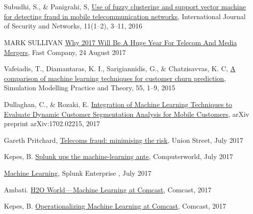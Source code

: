 \documentclass[12pt]{article}
\begin{document}
%
%

\section{}
\noindent

\begin{thebibliography}{9}
	Subudhi, S., \& Panigrahi, S, 
	\href{https://dl.acm.org/citation.cfm?id=2898531}{Use of fuzzy clustering and support vector machine for detecting fraud in mobile telecommunication networks}, 
	International Journal of Security and Networks, 
	11(1–2), 3–11,
	2016
	
	MARK SULLIVAN
	\href{https://www.fastcompany.com/3068696/why-2017-will-be-a-huge-year-for-telecom-and-media-mergers}{Why 2017 Will Be A Huge Year For Telecom And Media Mergers}, 
	Fast Company,
	24 August 2017
	
	Vafeiadis, T., Diamantaras, K. I., Sarigiannidis, G., \& Chatzisavvas, K. C, 
	\href{http://www.sciencedirect.com/science/article/pii/S1569190X15000386}{A comparison of machine learning techniques for customer churn prediction}, 
	Simulation Modelling Practice and Theory, 
	55, 1–9,
	2015
	
	Dullaghan, C., \& Rozaki, E. 
	\href{https://arxiv.org/abs/1702.02215}{Integration of Machine Learning Techniques to Evaluate Dynamic Customer Segmentation Analysis for Mobile Customers}, 
	arXiv preprint arXiv:1702.02215, 
	2017
	
	Gareth Pritchard,  
	\href{http://www.unionstreet.uk.com/telecoms-fraud-minimizing-the-risk/}{Telecoms fraud: minimising the risk}, 
	Union Street, 
	July 2017	
	
	Kepes, B.  
	\href{http://www.computerworld.com/article/3125517/big-data/splunk-ups-the-machine-learning-ante.html}{Splunk ups the machine-learning ante}, 
	Computerworld, 
	July 2017
	
	\href{https://www.splunk.com/en_us/products/splunk-enterprise/features/machine-learning.html}{Machine Learning}, 
	Splunk Enterprise , 
	July 2017
	
	
	
	Ambati.  
	\href{https://www.slideshare.net/0xdata/h2o-world-machine-learning-at-comcast-andrew-leamon-chushi-ren}{H2O World — Machine Learning at Comcast}, 
	Comcast,
	2017
	
	Kepes, B.  
	\href{http://www.h2o.ai/wp-content/uploads/2017/03/Case-Studies_Comcast.pdf}{Operationalizing Machine Learning at Comcast}, 
	Comcast, 
	2017
	

\end{thebibliography}
\end{document}
